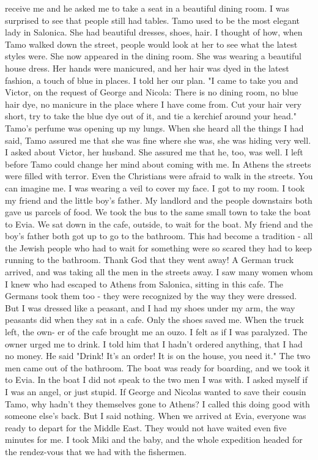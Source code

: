 receive me and he asked me to take a seat in a beautiful dining room.
I was surprised to see that people still had tables.
Tamo used to be the most elegant lady in Salonica.
She had beautiful dresses, shoes, hair.
I thought of how, when Tamo walked down the street, people would look at her to see what the latest styles were.
She now appeared in the dining room.
She was wearing a beautiful house  
dress.
Her hands were manicured, and her hair was dyed in the latest 
fashion, a touch of blue in places.
I told her our plan.
"I came to take you and Victor, on the request of George and Nicola: There is no dining room, no blue hair dye, no manicure in the place where I have come from.
Cut your hair very short, try to take the blue dye out of it, and tie a kerchief around your head."
Tamo's perfume was opening up my lungs.
When she heard all the 
things I had said, Tamo assured me that she was fine where she was, she 
was hiding very well.
I asked about Victor, her husband.
She assured 
me that he, too, was well.
I left before Tamo could change her mind 
about coming with me.
In Athens the streets were filled with terror.
Even the Christians 
were afraid to walk in the streets.
You can imagine me.
I was wearing 
a veil to cover my face.
I got to my room.
I took my friend and the 
little boy's father.
My landlord and the people downstairs both gave 
us parcels of food.
We took the bus to the same small town to take the 
boat to Evia.
We sat down in the cafe, outside, to wait for the 
boat.
My friend and the boy's father both got up to go to the bathroom.
This had become a tradition - all the Jewish people who had to wait for 
something were so scared they had to keep running to the bathroom.
Thank God that they went away!
A German truck arrived, and was taking all the men in the streets 
away.
I saw many women whom I knew who had escaped to Athens from Salonica, sitting in this cafe.
The Germans took them too - they were 
recognized by the way they were dressed.
But I was dressed like a peasant, and I had my shoes under my arm, the way peasants did when they 
sat in a cafe.
Only the shoes saved me.
When the truck left, the own-
er of the cafe brought me an ouzo.
I felt as if I was paralyzed.
The 
owner urged me to drink.
I told him that I hadn't ordered anything, 
that I had no money.
He said "Drink!
It's an order!
It is on the house, 
you need it."
The two men came out of the bathroom.
The boat was ready for boarding, and we took it to Evia.
In the boat I did not speak to the two men I was with.
I asked myself if I was an angel, or just stupid.
If George and Nicolas wanted to save their cousin Tamo, why hadn't 
they themselves gone to Athens?
I called this doing good with someone 
else's back.
But I said nothing.
When we arrived at Evia, everyone was ready to depart for the Middle 
East.
They would not have waited even five minutes for me.
I took Miki 
and the baby, and the whole expedition headed for the rendez-vous that 
we had with the fishermen.
